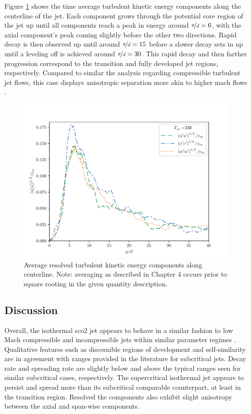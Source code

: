 Figure \ref{330_TKE_features} shows the time average turbulent kinetic energy components along the centerline of the jet. Each component grows through the potential core region of the jet up until all components reach a peak in energy around $\nicefrac{y}{d}=6$, with the axial component's peak coming slightly before the other two directions. Rapid decay is then observed up until around $\nicefrac{y}{d} = 15$ before a slower decay sets in up until a leveling off is achieved around $\nicefrac{y}{d} = 30$. This rapid decay and then farther progression correspond to the transition and fully developed jet regions, respectively. Compared to similar \gls{tke} analysis regarding compressible turbulent jet flows, this case displays anisotropic separation more akin to higher mach flows \cite{iso_comp_2}.

\begin{figure}[hbtp!]
\begin{center}
	\includegraphics[scale=.7]{figures/Plots/centerline/330_TKEuvw_centerline.pdf}
	\caption{Average resolved turbulent kinetic energy components along centerline. Note: averaging as described in Chapter 4 occurs prior to square rooting in the given quantity description.} \label{330_TKE_features}
\end{center}
\end{figure}

\subsection{Discussion}
Overall, the isothermal \gls{sco2} jet appears to behave in a similar fashion to low Mach compressible and incompressible jets within similar parameter regimes \cite{iso_comp_1, iso_comp_1_ref_1, iso_comp_2, Pope}. Qualitative features such as discernible regions of development and self-similarity are in agreement with ranges provided in the literature for subcritical jets. Decay rate and spreading rate are slightly below and above the typical ranges seen for similar subcritical cases, respectively. The supercritical isothermal jet appears to persist and spread more than its subcritical comparable counterpart, at least in the transition region. Resolved \gls{tke} components also exhibit slight anisotropy between the axial and span-wise components. 

